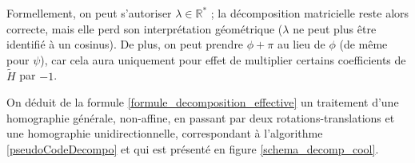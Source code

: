 Formellement, on peut s'autoriser $\lambda \in \mathbb R^*$ ; la décomposition matricielle reste alors correcte, mais elle perd son interprétation géométrique ($\lambda$ ne peut plus être identifié à un cosinus). De plus, on peut prendre $\phi + \pi$ au lieu de $\phi$ (de même pour $\psi$), car cela aura uniquement pour effet de multiplier certains coefficients de $\tilde H$ par $-1$.
 
 On déduit de la formule \ref{formule_decomposition_effective} un traitement d'une homographie générale, non-affine, en passant par deux rotations-translations et une homographie unidirectionnelle, correspondant à l'algorithme \ref{pseudoCodeDecompo} et qui est présenté en figure \ref{schema_decomp_cool}.
 \label{ref_schema_decomp_cool}
		
	\begin{figure}
		\centering
		\\

\end{figure}
